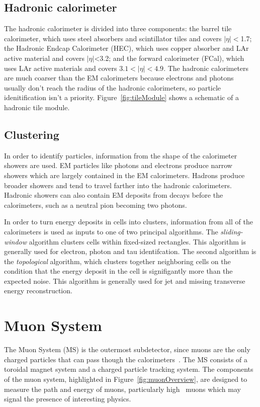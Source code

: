 \subsection{Hadronic calorimeter}
The hadronic calorimeter is divided into three components: the barrel tile calorimeter, which uses steel absorbers and scintillator tiles and covers $|\eta| <$1.7; the Hadronic Endcap Calorimeter (HEC), which uses copper absorber and LAr active material and covers $|\eta|$<3.2; and the forward calorimeter (FCal), which uses LAr active materials and covers $3.1 < |\eta| < 4.9$. The hadronic calorimeters are much coarser than the EM calorimeters because electrons and photons usually don't reach the radius of the hadronic calorimeters, so particle idenitification isn't a priority. Figure~\ref{fig:tileModule} shows a schematic of a hadronic tile module.

\subsection{Clustering}
\label{ss:cluster}
In order to identify particles, information from the shape of the calorimeter showers are used. EM particles like photons and electrons produce narrow showers which are largely contained in the EM calorimeters. Hadrons produce broader showers and tend to travel farther into the hadronic calorimeters. Hadronic showers can also contain EM deposits from decays before the calorimeters, such as a neutral pion becoming two photons. 

In order to turn energy deposits in cells into clusters, information from all of the calorimeters is used as inputs to one of two principal algorithms\cite{ATL-LARG-PUB-2008-002}. The \emph{sliding-window} algorithm clusters cells within fixed-sized rectangles. This algorithm is generally used for electron, photon and tau identifcation. The second algorithm is the \emph{topological} algorithm, which clusters together neighboring cells on the condition that the energy deposit in the cell is signifigantly more than the expected noise. This algorithm is generally used for jet and missing transverse energy reconstruction.

\section{Muon System}
The Muon System (MS) is the outermost subdetector, since muons are the only charged particles that can pass though the calorimeters~\cite{2010.muonspectrometer}. The MS consists of a toroidal magnet system and a charged particle tracking system. The components of the muon system, highlighted in Figure~\ref{fig:muonOverview}, are designed to measure the path and energy of muons, particularly high \pt\ muons which may signal the presence of interesting physics.

